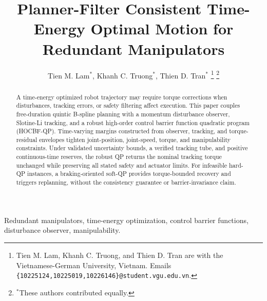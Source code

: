 \documentclass[conference]{IEEEtran}
\begin{document}
\title{Planner-Filter Consistent Time-Energy Optimal Motion for Redundant Manipulators}
\author{
Tien M. Lam$^{*}$,
Khanh C. Truong$^{*}$,
Thien D. Tran$^{*}$ 
\thanks{Tien M. Lam, Khanh C. Truong, and Thien D. Tran are with the Vietnamese-German University, Vietnam. Emails \texttt{\{10225124,10225019,10226146\}@student.vgu.edu.vn}.}
\thanks{$^{*}$These authors contributed equally.}
}
\maketitle
\begin{abstract}
A time-energy optimized robot trajectory may require torque corrections when disturbances, tracking errors, or safety filtering affect execution. This paper couples free-duration quintic B-spline planning with a momentum disturbance observer, Slotine-Li tracking, and a robust high-order control barrier function quadratic program (HOCBF-QP). Time-varying margins constructed from observer, tracking, and torque-residual envelopes tighten joint-position, joint-speed, torque, and manipulability constraints. Under validated uncertainty bounds, a verified tracking tube, and positive continuous-time reserves, the robust QP returns the nominal tracking torque unchanged while preserving all stated safety and actuator limits. For infeasible hard-QP instances, a braking-oriented soft-QP provides torque-bounded recovery and triggers replanning, without the consistency guarantee or barrier-invariance claim.
\end{abstract}
\begin{IEEEkeywords}
Redundant manipulators, time-energy optimization, control barrier functions, disturbance observer, manipulability.
\end{IEEEkeywords}





\end{document}
